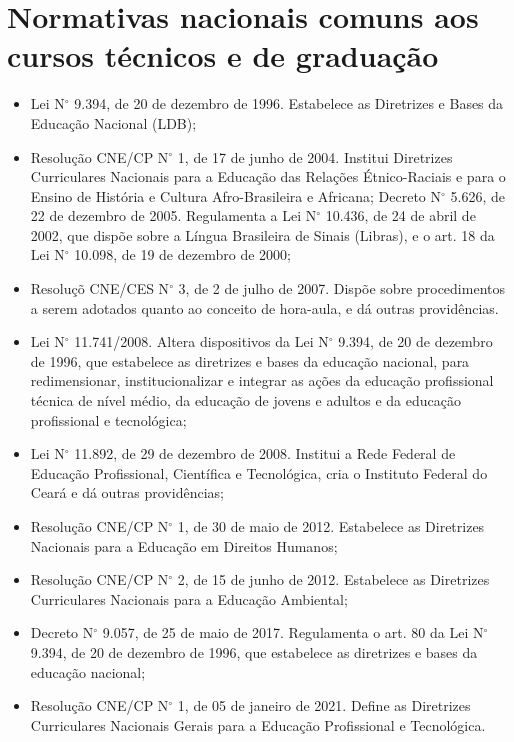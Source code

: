 \documentclass[
	12pt,				%
	openright,			%
	twoside,			%
	a4paper,			%
	chapter=TITLE,		%
	english,			%
	french,				%
	spanish,			%
	brazil,				%
	]{abntex2}
\newcommand{\nord}[1]{N$^\circ$ #1}
\begin{document}
\section{Normativas nacionais comuns aos cursos técnicos e de graduação}

\begin{itemize}
   \item Lei \nord{9.394}, de 20 de dezembro de 1996. Estabelece as Diretrizes e Bases da Educa\c{c}\~ao Nacional (LDB);
\item Resolu\c{c}\~ao CNE/CP \nord{1}, de 17 de junho de 2004. Institui Diretrizes Curriculares Nacionais para a Educa\c{c}\~ao das Rela\c{c}\~oes \'Etnico-Raciais e para o Ensino de Hist\'oria e Cultura Afro-Brasileira e Africana;
Decreto \nord{5.626}, de 22 de dezembro de 2005. Regulamenta a Lei \nord{10.436}, de 24 de abril
de 2002, que disp\~oe sobre a L\'i­ngua Brasileira de Sinais (Libras), e o art. 18 da Lei \nord{10.098},
de 19 de dezembro de 2000;
\item  Resolu\c{c}\~o CNE/CES \nord{3}, de 2 de julho de 2007. Disp\~oe sobre procedimentos a serem
adotados quanto ao conceito de hora-aula, e d\'a outras provid\^encias.
\item  Lei \nord{11.741/2008}. Altera dispositivos da Lei \nord{9.394}, de 20 de dezembro de 1996, que
estabelece as diretrizes e bases da educa\c{c}\~ao nacional, para redimensionar, institucionalizar
e integrar as a\c{c}\~oes da educa\c{c}\~ao profissional t\'ecnica de n\'ivel m\'edio, da educa\c{c}\~ao de jovens
e adultos e da educa\c{c}\~ao profissional e tecnol\'ogica;
\item Lei \nord{11.892}, de 29 de dezembro de 2008. Institui a Rede Federal de Educa\c{c}\~ao Profissional,
Cient\'ifica e Tecnol\'ogica, cria o Instituto Federal do Cear\'a e d\'a outras provid\^encias;
\item Resolu\c{c}\~ao CNE/CP \nord{1}, de 30 de maio de 2012. Estabelece as Diretrizes Nacionais para a
Educa\c{c}\~ao em Direitos Humanos;

\item Resolu\c{c}\~ao CNE/CP \nord{2}, de 15 de junho de 2012. Estabelece as Diretrizes Curriculares
Nacionais para a Educa\c{c}\~ao Ambiental;
\item Decreto \nord{9.057}, de 25 de maio de 2017. Regulamenta o art. 80 da Lei \nord{9.394}, de 20 de
dezembro de 1996, que estabelece as diretrizes e bases da educa\c{c}\~ao nacional;
\item Resolu\c{c}\~ao CNE/CP \nord{1}, de 05 de janeiro de 2021. Define as Diretrizes Curriculares Nacionais
Gerais para a Educa\c{c}\~ao Profissional e Tecnol\'ogica.
\end{itemize}
\end{document}

